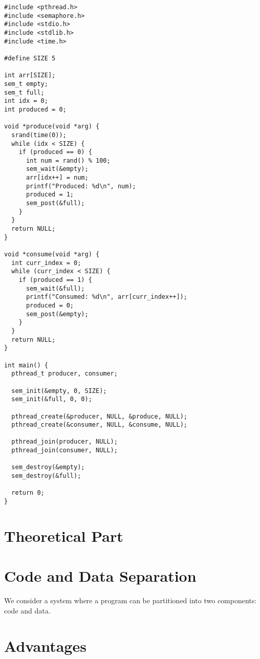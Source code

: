 \documentclass{article}
\begin{document}
\begin{lstlisting}[style=cstyle]
#include <pthread.h>
#include <semaphore.h>
#include <stdio.h>
#include <stdlib.h>
#include <time.h>

#define SIZE 5

int arr[SIZE];
sem_t empty;
sem_t full;
int idx = 0;
int produced = 0;

void *produce(void *arg) {
  srand(time(0));
  while (idx < SIZE) {
    if (produced == 0) {
      int num = rand() % 100;
      sem_wait(&empty);
      arr[idx++] = num;
      printf("Produced: %d\n", num);
      produced = 1;
      sem_post(&full);
    }
  }
  return NULL;
}

void *consume(void *arg) {
  int curr_index = 0;
  while (curr_index < SIZE) {
    if (produced == 1) {
      sem_wait(&full);
      printf("Consumed: %d\n", arr[curr_index++]);
      produced = 0;
      sem_post(&empty);
    }
  }
  return NULL;
}

int main() {
  pthread_t producer, consumer;

  sem_init(&empty, 0, SIZE);
  sem_init(&full, 0, 0);

  pthread_create(&producer, NULL, &produce, NULL);
  pthread_create(&consumer, NULL, &consume, NULL);

  pthread_join(producer, NULL);
  pthread_join(consumer, NULL);

  sem_destroy(&empty);
  sem_destroy(&full);

  return 0;
}
\end{lstlisting}

\pagebreak

\section*{Theoretical Part}%
\setcounter{section}{0}

\section{Code and Data Separation}
We consider a system where a program can be partitioned into two components: code and data.

\section*{Advantages}
\end{document}
